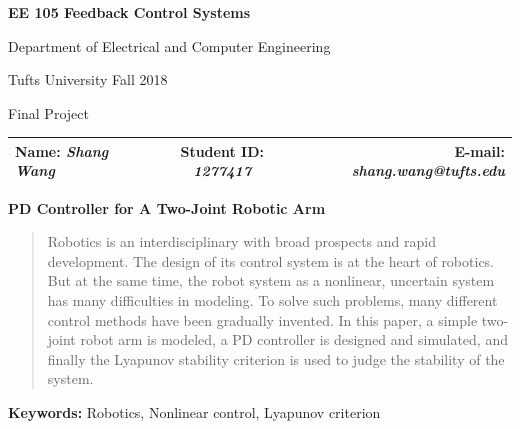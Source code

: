 \documentclass[a4paper]{article}
\begin{document}
\begin{center}
\bf\Large
EE 105 Feedback Control Systems\par
Department of Electrical and Computer Engineering\par
Tufts University Fall 2018\par
Final Project\par   
\end{center}
\begin{table}[H]
\begin{center}
\begin{tabular*}{\textwidth}{@{\extracolsep{\fill}}lcr}
Name: {\it Shang Wang} &Student ID: {\it 1277417} &E-mail: {\it shang.wang@tufts.edu}\\
\hline
\end{tabular*}
\end{center}
\end{table}




\begin{center}
\Large\bf PD Controller for A Two-Joint Robotic Arm
\end{center}
\setlength{\baselineskip}{1.3\baselineskip}


\begin{abstract}
Robotics is an interdisciplinary with broad prospects and rapid development. The design of its control system is at the heart of robotics. But at the same time, the robot system as a nonlinear, uncertain system has many difficulties in modeling. To solve such problems, many different control methods have been gradually invented. In this paper, a simple two-joint robot arm is modeled, a PD controller is designed and simulated, and finally the Lyapunov stability criterion is used to judge the stability of the system.
\end{abstract}
\begin{center}
\small{{\bf Keywords: }Robotics, Nonlinear control, Lyapunov criterion}
\end{center}
\end{document}
